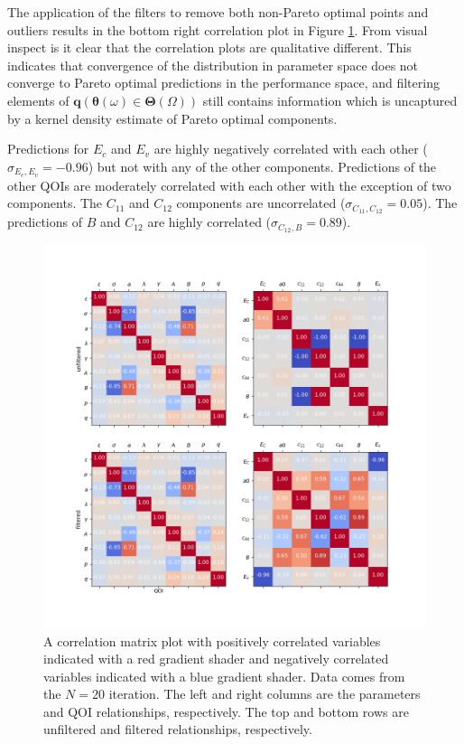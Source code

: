 The application of the filters to remove both non-Pareto optimal points and outliers results in the bottom right correlation plot in Figure \ref{fig:Si_correlation_plots}.  From visual inspect is it clear that the correlation plots are qualitative different.  This indicates that convergence of the distribution in parameter space does not converge to Pareto optimal predictions in the performance space, and filtering elements of $\bm{q}(\bm{\theta}(\omega) \in \bm{\Theta}(\Omega))$ still contains information which is uncaptured by a kernel density estimate of Pareto optimal components.

Predictions for $E_c$ and $E_v$ are highly negatively correlated with each other ($\sigma_{E_c,E_v}=-0.96$) but not with any of the other components.  Predictions of the other QOIs are moderately correlated with each other with the exception of two components.  The $C_{11}$ and $C_{12}$ components are uncorrelated ($\sigma_{C_{11},C_{12}}=0.05$).  The predictions of $B$ and $C_{12}$ are highly correlated ($\sigma_{C_{12},B}=0.89$).

\begin{figure}[ht]
  \centering
  \includegraphics[width=5in]{chapter8/fig_cov_19}
  \caption{A correlation matrix plot with positively correlated variables indicated with a red gradient shader and negatively correlated variables indicated with a blue gradient shader.  Data comes from the $N=20$ iteration.  The left and right columns are the parameters and QOI relationships, respectively.  The top and bottom rows are unfiltered and filtered relationships, respectively.}
  \label{fig:Si_correlation_plots}
\end{figure}

